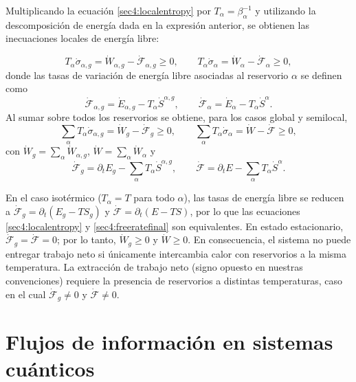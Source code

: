 Multiplicando la ecuación \eqref{sec4:localentropy} por $T_{\alpha}=\beta_{\alpha}^{-1}$ y utilizando la descomposición de energía dada en la expresión anterior, se obtienen las inecuaciones locales de energía libre:

\begin{equation}
    T_{\alpha}\dot{\sigma}_{\alpha,g}
    = \dot{W}_{\alpha,g}-\dot{\mathcal{F}}_{\alpha,g}\ge 0,
    \qquad
    T_{\alpha}\dot{\sigma}_{\alpha}
    = \dot{W}_{\alpha}-\dot{\mathcal{F}}_{\alpha}\ge 0,
    \label{sec4:localfreerate}
\end{equation}
donde las tasas de variación de energía libre asociadas al reservorio $\alpha$ se definen como
\[
\dot{\mathcal{F}}_{\alpha,g}
= \dot{E}_{\alpha,g}-T_{\alpha}\dot{S}^{\alpha,g},
\qquad
\dot{\mathcal{F}}_{\alpha}
= \dot{E}_{\alpha}-T_{\alpha}\dot{S}^{\alpha}.
\]
Al sumar sobre todos los reservorios se obtiene, para los casos global y semilocal,
\begin{equation}
    \sum_{\alpha}T_{\alpha}\dot{\sigma}_{\alpha,g}
    = \dot{W}_{g}-\dot{\mathcal{F}}_{g}\ge 0,
    \qquad
    \sum_{\alpha}T_{\alpha}\dot{\sigma}_{\alpha}
    = \dot{W}-\dot{\mathcal{F}}\ge 0,
    \label{sec4:freeratefinal}
\end{equation}
con $\dot{W}_{g}=\sum_{\alpha}\dot{W}_{\alpha,g}$,
$\dot{W}=\sum_{\alpha}\dot{W}_{\alpha}$ y
\[
\dot{\mathcal{F}}_{g}
=\partial_{t}E_{g}-\sum_{\alpha}T_{\alpha}\dot{S}^{\alpha,g},
\qquad
\dot{\mathcal{F}}
=\partial_{t}E-\sum_{\alpha}T_{\alpha}\dot{S}^{\alpha}.
\]

En el caso isotérmico ($T_{\alpha}=T$ para todo $\alpha$), las tasas de energía libre se reducen a
$\dot{\mathcal{F}}_{g}=\partial_{t}(E_{g}-TS_{g})$ y
$\dot{\mathcal{F}}=\partial_{t}(E-TS)$, por lo que las ecuaciones
\eqref{sec4:localentropy} y \eqref{sec4:freeratefinal} son equivalentes. En estado estacionario,
$\dot{\mathcal{F}}_{g}=\dot{\mathcal{F}}=0$; por lo tanto,
$\dot{W}_{g}\ge 0$ y $\dot{W}\ge 0$. En consecuencia, el sistema no puede entregar trabajo neto si únicamente intercambia calor con reservorios a la misma temperatura. La extracción de trabajo neto (signo opuesto en nuestras convenciones) requiere la presencia de reservorios a distintas temperaturas, caso en el cual $\dot{\mathcal{F}}_{g}\neq 0$ y $\dot{\mathcal{F}}\neq 0$.


\section{Flujos de información en sistemas cuánticos}

